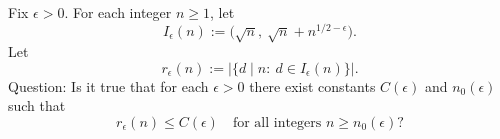 Fix $\epsilon>0$. For each integer $n\ge 1$, let
\[I_{\epsilon}(n):=\big(\sqrt n,\ \sqrt n+n^{1/2-\epsilon}\big).
\]
Let
\[r_{\epsilon}(n):=\big|\{d\mid n:\ d\in I_{\epsilon}(n)\}\big|.
\]
Question: Is it true that for each $\epsilon>0$ there exist constants $C(\epsilon)$ and $n_0(\epsilon)$ such that
\[r_{\epsilon}(n)\le C(\epsilon)\quad\text{for all integers }n\ge n_0(\epsilon)?
\]
